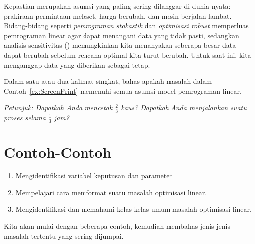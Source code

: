 Kepastian merupakan asumsi yang paling sering dilanggar di dunia nyata: prakiraan permintaan meleset, harga berubah, dan mesin berjalan lambat. Bidang-bidang seperti \emph{pemrograman stokastik} dan \emph{optimisasi robust} memperluas pemrograman linear agar dapat menangani data yang tidak pasti, sedangkan analisis sensitivitas (\OOSensitivityReference{}) memungkinkan kita menanyakan seberapa besar data dapat berubah sebelum rencana optimal kita turut berubah. Untuk saat ini, kita menganggap data yang diberikan sebagai tetap.

\begin{learningcheckpoint}[label={lc:lp-assumptions}]
Dalam satu atau dua kalimat singkat, bahas apakah masalah dalam
Contoh~\ref{ex:ScreenPrint} memenuhi semua asumsi model pemrograman linear.

\emph{Petunjuk: Dapatkah Anda mencetak $\tfrac{2}{3}$ kaus? Dapatkah Anda menjalankan suatu proses
selama $\tfrac{1}{3}$ jam?}
\end{learningcheckpoint}

\section{Contoh-Contoh}
\label{sec:lp-examples}

\begin{outcome}

\begin{enumerate}
\item Mengidentifikasi variabel keputusan dan parameter
\item Mempelajari cara memformat suatu masalah optimisasi linear.
\item Mengidentifikasi dan memahami kelas-kelas umum masalah optimisasi linear.
\end{enumerate}
\end{outcome}

Kita akan mulai dengan beberapa contoh, kemudian membahas jenis-jenis masalah tertentu yang sering dijumpai.

